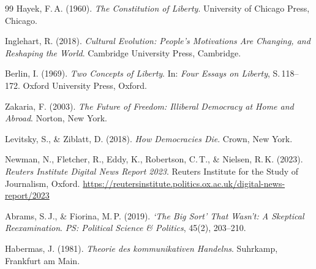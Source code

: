 ﻿\documentclass[a4paper,12pt]{article}
\theoremstyle{definition}
\begin{document}
\begin{thebibliography}{99}
Hayek, F.\,A. (1960).
\textit{The Constitution of Liberty}.
University of Chicago Press, Chicago.

Inglehart, R. (2018).
\textit{Cultural Evolution: People's Motivations Are Changing, and Reshaping the World}.
Cambridge University Press, Cambridge.

Berlin, I. (1969).
\textit{Two Concepts of Liberty}.
In: \textit{Four Essays on Liberty}, S.\,118--172.
Oxford University Press, Oxford.

Zakaria, F. (2003).
\textit{The Future of Freedom: Illiberal Democracy at Home and Abroad}.
Norton, New York.

Levitsky, S., \& Ziblatt, D. (2018).
\textit{How Democracies Die}.
Crown, New York.

Newman, N., Fletcher, R., Eddy, K., Robertson, C.\,T., \& Nielsen, R.\,K. (2023).
\textit{Reuters Institute Digital News Report 2023}.
Reuters Institute for the Study of Journalism, Oxford.
\url{https://reutersinstitute.politics.ox.ac.uk/digital-news-report/2023}

Abrams, S.\,J., \& Fiorina, M.\,P. (2019).
\textit{`The Big Sort' That Wasn't: A Skeptical Reexamination}.
\textit{PS: Political Science \& Politics}, 45(2), 203--210.

Habermas, J. (1981).
\textit{Theorie des kommunikativen Handelns}.
Suhrkamp, Frankfurt am Main.

\end{thebibliography}
\end{document}
